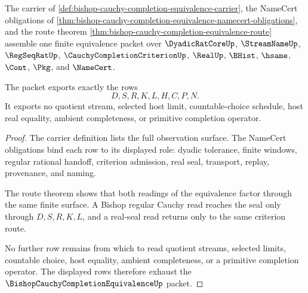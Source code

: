 \begin{theorem}
\label{thm:bishop-cauchy-completion-equivalence-non-escape}
The carrier of \autoref{def:bishop-cauchy-completion-equivalence-carrier}, the NameCert obligations of \autoref{thm:bishop-cauchy-completion-equivalence-namecert-obligations}, and the route theorem \autoref{thm:bishop-cauchy-completion-equivalence-route} assemble one finite equivalence packet over $\DyadicRatCoreUp$, $\StreamNameUp$, $\RegSeqRatUp$, $\CauchyCompletionCriterionUp$, $\RealUp$, $\BHist$, $\hsame$, $\Cont$, $\Pkg$, and $\NameCert$.

The packet exports exactly the rows
$$
D,S,R,K,L,H,C,P,N.
$$
It exports no quotient stream, selected host limit, countable-choice schedule, host real equality, ambient completeness, or primitive completion operator.
\end{theorem}
\begin{proof}
The carrier definition lists the full observation surface. The NameCert obligations bind each row to its displayed role: dyadic tolerance, finite windows, regular rational handoff, criterion admission, real seal, transport, replay, provenance, and naming.

The route theorem shows that both readings of the equivalence factor through the same finite surface. A Bishop regular Cauchy read reaches the seal only through $D,S,R,K,L$, and a real-seal read returns only to the same criterion route.

No further row remains from which to read quotient streams, selected limits, countable choice, host equality, ambient completeness, or a primitive completion operator. The displayed rows therefore exhaust the $\BishopCauchyCompletionEquivalenceUp$ packet.
\end{proof}


\begin{closurestatus}{\BishopCauchyCompletionEquivalenceUp}
  \theoryclosure{\seedClosure}
  \formalstatus{\unformalizedV}
\end{closurestatus}
